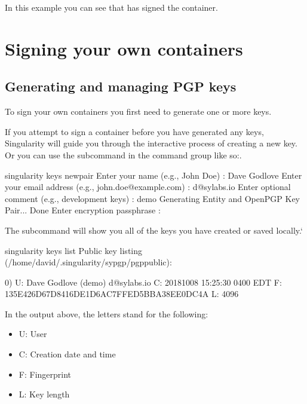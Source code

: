 \documentclass[letterpaper,10pt,english]{sphinxmanual}
\begin{document}
In this example you can see that  has signed the container.


\section{Signing your own containers}
\label{\detokenize{signNverify:signing-your-own-containers}}

\subsection{Generating and managing PGP keys}
\label{\detokenize{signNverify:generating-and-managing-pgp-keys}}
To sign your own containers you first need to generate one or more keys.

If you attempt to sign a container before you have generated any keys,
Singularity will guide you through the interactive process of creating a new
key. Or you can use the  subcommand in the  command group
like so:.

%
\begin{sphinxVerbatim}[commandchars=\\\{\}]
\PYGZdl{} singularity keys newpair
Enter your name (e.g., John Doe) : Dave Godlove
Enter your email address (e.g., john.doe@example.com) : d@sylabs.io
Enter optional comment (e.g., development keys) : demo
Generating Entity and OpenPGP Key Pair... Done
Enter encryption passphrase :
\end{sphinxVerbatim}

The  subcommand will show you all of the keys you have created or saved
locally.{}`

%
\begin{sphinxVerbatim}[commandchars=\\\{\}]
\PYGZdl{} singularity keys list
Public key listing (/home/david/.singularity/sypgp/pgp\PYGZhy{}public):

0) U: Dave Godlove (demo) \PYGZlt{}d@sylabs.io\PYGZgt{}
   C: 2018\PYGZhy{}10\PYGZhy{}08 15:25:30 \PYGZhy{}0400 EDT
   F: 135E426D67D8416DE1D6AC7FFED5BBA38EE0DC4A
   L: 4096
   \PYGZhy{}\PYGZhy{}\PYGZhy{}\PYGZhy{}\PYGZhy{}\PYGZhy{}\PYGZhy{}\PYGZhy{}
\end{sphinxVerbatim}

In the output above, the letters stand for the following:
\begin{itemize}
\item {} 
U: User

\item {} 
C: Creation date and time

\item {} 
F: Fingerprint

\item {} 
L: Key length

\end{itemize}
\end{document}
